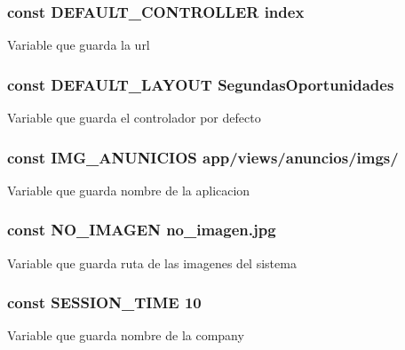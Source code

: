 \subsubsection[{D\+E\+F\+A\+U\+L\+T\+\_\+\+C\+O\+N\+T\+R\+O\+L\+L\+E\+R}]{\setlength{\rightskip}{0pt plus 5cm}const D\+E\+F\+A\+U\+L\+T\+\_\+\+C\+O\+N\+T\+R\+O\+L\+L\+E\+R \textquotesingle{}index\textquotesingle{}}\label{_config_8php_ae05204cd87e8b77b35a92c595e4d897a}
Variable que guarda la url \hypertarget{_config_8php_a2a1a79da0bc551583b2718abfed84c1d}{}
\subsubsection[{D\+E\+F\+A\+U\+L\+T\+\_\+\+L\+A\+Y\+O\+U\+T}]{\setlength{\rightskip}{0pt plus 5cm}const D\+E\+F\+A\+U\+L\+T\+\_\+\+L\+A\+Y\+O\+U\+T \textquotesingle{}Segundas\+Oportunidades\textquotesingle{}}\label{_config_8php_a2a1a79da0bc551583b2718abfed84c1d}
Variable que guarda el controlador por defecto \hypertarget{_config_8php_a669c89cea3882b811ec20c68e14053a9}{}
\subsubsection[{I\+M\+G\+\_\+\+A\+N\+U\+N\+I\+C\+I\+O\+S}]{\setlength{\rightskip}{0pt plus 5cm}const I\+M\+G\+\_\+\+A\+N\+U\+N\+I\+C\+I\+O\+S \textquotesingle{}app/views/anuncios/imgs/\textquotesingle{}}\label{_config_8php_a669c89cea3882b811ec20c68e14053a9}
Variable que guarda nombre de la aplicacion \hypertarget{_config_8php_a26f7146c1280c098e322f6285fba78d2}{}
\subsubsection[{N\+O\+\_\+\+I\+M\+A\+G\+E\+N}]{\setlength{\rightskip}{0pt plus 5cm}const N\+O\+\_\+\+I\+M\+A\+G\+E\+N \textquotesingle{}no\+\_\+imagen.\+jpg\textquotesingle{}}\label{_config_8php_a26f7146c1280c098e322f6285fba78d2}
Variable que guarda ruta de las imagenes del sistema \hypertarget{_config_8php_a7a117a7005f451700303761ecfb3e667}{}
\subsubsection[{S\+E\+S\+S\+I\+O\+N\+\_\+\+T\+I\+M\+E}]{\setlength{\rightskip}{0pt plus 5cm}const S\+E\+S\+S\+I\+O\+N\+\_\+\+T\+I\+M\+E 10}\label{_config_8php_a7a117a7005f451700303761ecfb3e667}
Variable que guarda nombre de la company 